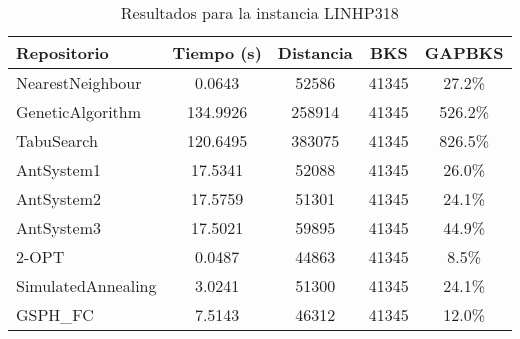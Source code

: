 \begin{table}[H]
\centering
\caption{Resultados para la instancia LINHP318}
\begin{tabular}{|l|c|c|c|c|}
\hline
\textbf{Repositorio} & \textbf{Tiempo (s)} & \textbf{Distancia} & \textbf{BKS} & \textbf{GAPBKS} \\ 
\hline
NearestNeighbour & 0.0643 & 52586 & 41345 & 27.2\% \\ 
GeneticAlgorithm & 134.9926 & 258914 & 41345 & 526.2\% \\ 
TabuSearch & 120.6495 & 383075 & 41345 & 826.5\% \\ 
AntSystem1 & 17.5341 & 52088 & 41345 & 26.0\% \\ 
AntSystem2 & 17.5759 & 51301 & 41345 & 24.1\% \\ 
AntSystem3 & 17.5021 & 59895 & 41345 & 44.9\% \\ 
2-OPT & 0.0487 & 44863 & 41345 & 8.5\% \\ 
SimulatedAnnealing & 3.0241 & 51300 & 41345 & 24.1\% \\ 
GSPH_FC & 7.5143 & 46312 & 41345 & 12.0\% \\ 
\hline
\end{tabular}
\end{table}
